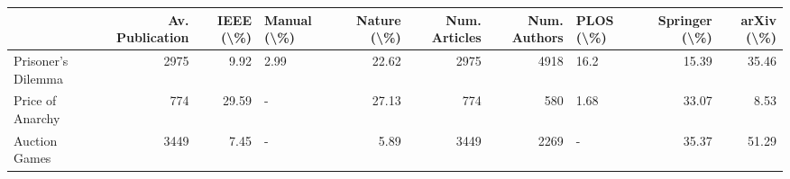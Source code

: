 \begin{tabular}{lrrlrrrlrr}
\toprule
{} &  Av. Publication &  IEEE (\textbackslash\%) & Manual (\textbackslash\%) &  Nature (\textbackslash\%) &  Num. Articles &  Num. Authors & PLOS (\textbackslash\%) &  Springer (\textbackslash\%) &  arXiv (\textbackslash\%) \\
\midrule
Prisoner's Dilemma &             2975 &       9.92 &        2.99 &        22.62 &           2975 &          4918 &      16.2 &          15.39 &       35.46 \\
Price of Anarchy   &              774 &      29.59 &           - &        27.13 &            774 &           580 &      1.68 &          33.07 &        8.53 \\
Auction Games      &             3449 &       7.45 &           - &         5.89 &           3449 &          2269 &         - &          35.37 &       51.29 \\
\bottomrule
\end{tabular}
